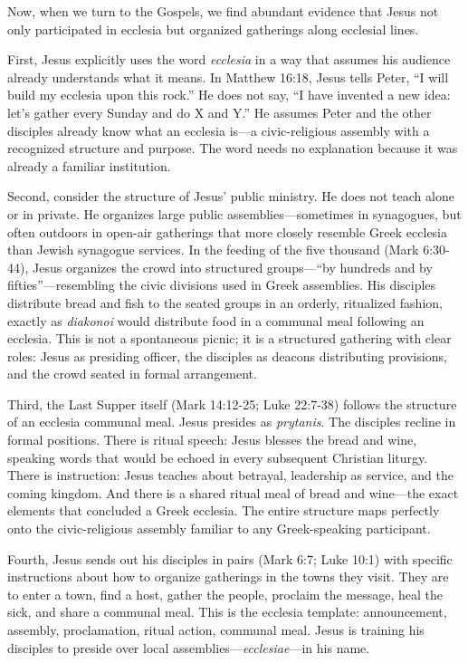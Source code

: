 Now, when we turn to the Gospels, we find abundant evidence that Jesus not only participated in ecclesia but organized gatherings along ecclesial lines.

First, Jesus explicitly uses the word \emph{ecclesia} in a way that assumes his audience already understands what it means.
In Matthew 16:18, Jesus tells Peter, ``I will build my ecclesia upon this rock.''
He does not say, ``I have invented a new idea: let's gather every Sunday and do X and Y.''
He assumes Peter and the other disciples already know what an ecclesia is---a civic-religious assembly with a recognized structure and purpose.
The word needs no explanation because it was already a familiar institution.

Second, consider the structure of Jesus' public ministry.
He does not teach alone or in private.
He organizes large public assemblies---sometimes in synagogues, but often outdoors in open-air gatherings that more closely resemble Greek ecclesia than Jewish synagogue services.
In the feeding of the five thousand (Mark 6:30-44), Jesus organizes the crowd into structured groups---``by hundreds and by fifties''---resembling the civic divisions used in Greek assemblies.
His disciples distribute bread and fish to the seated groups in an orderly, ritualized fashion, exactly as \emph{diakonoi} would distribute food in a communal meal following an ecclesia.
This is not a spontaneous picnic; it is a structured gathering with clear roles: Jesus as presiding officer, the disciples as deacons distributing provisions, and the crowd seated in formal arrangement.

Third, the Last Supper itself (Mark 14:12-25; Luke 22:7-38) follows the structure of an ecclesia communal meal.
Jesus presides as \emph{prytanis}.
The disciples recline in formal positions.
There is ritual speech: Jesus blesses the bread and wine, speaking words that would be echoed in every subsequent Christian liturgy.
There is instruction: Jesus teaches about betrayal, leadership as service, and the coming kingdom.
And there is a shared ritual meal of bread and wine---the exact elements that concluded a Greek ecclesia.
The entire structure maps perfectly onto the civic-religious assembly familiar to any Greek-speaking participant.

Fourth, Jesus sends out his disciples in pairs (Mark 6:7; Luke 10:1) with specific instructions about how to organize gatherings in the towns they visit.
They are to enter a town, find a host, gather the people, proclaim the message, heal the sick, and share a communal meal.
This is the ecclesia template: announcement, assembly, proclamation, ritual action, communal meal.
Jesus is training his disciples to preside over local assemblies---\emph{ecclesiae}---in his name.

